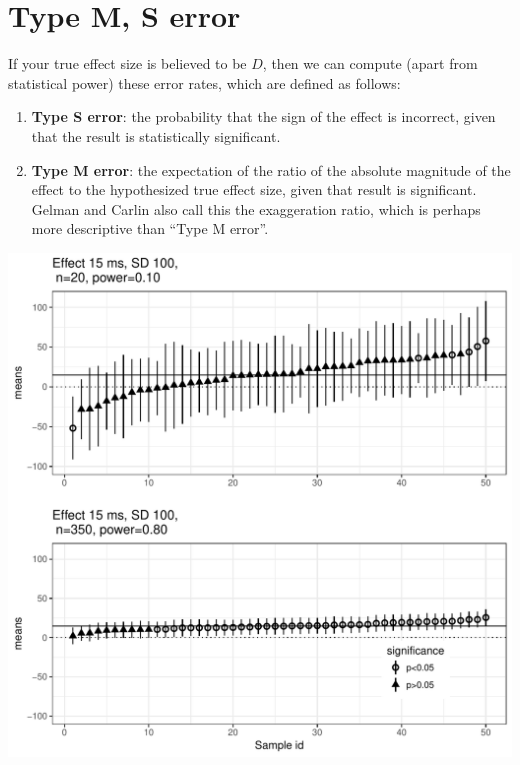 \documentclass[12pt]{article}
\begin{document}
\section{Type M, S error}

If your true effect size is believed to be $D$, 
then we can compute (apart from statistical power) these error rates, which are defined as follows:

\begin{enumerate}
\item
\textbf{Type S error}: the probability that the sign of the effect is incorrect, given that the result is statistically significant.
\item 
\textbf{Type M error}: the expectation of the ratio of the absolute magnitude of the effect to the hypothesized true effect size, given that result is significant. 
Gelman and Carlin also call this the exaggeration ratio, which is perhaps more descriptive than ``Type M error''.
\end{enumerate}

{\centering \includegraphics{figures/fig-demotypeM-1} 
}
\end{document}
